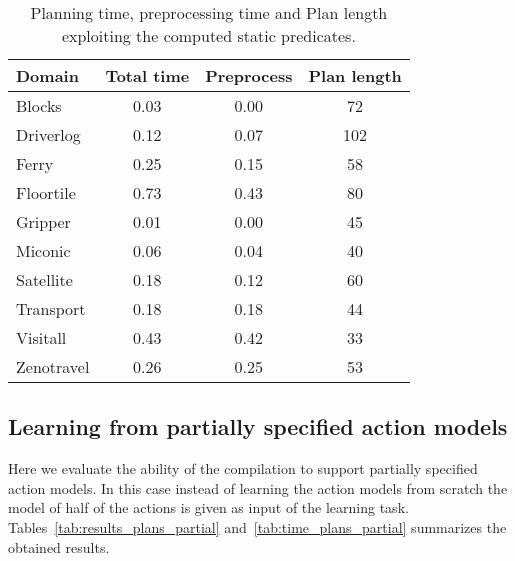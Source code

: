 \documentclass[letterpaper]{article} %
\begin{document}
\begin{table}[hbt!]
\begin{footnotesize}
	\begin{center}
		\begin{tabular}{l|c|c|c|}			
			Domain & Total time & Preprocess & Plan length  \\
			\hline
			Blocks & 0.03 & 0.00 & 72 \\
			Driverlog & 0.12 & 0.07 & 102 \\
			Ferry & 0.25 & 0.15 & 58 \\
			Floortile & 0.73 & 0.43 & 80 \\
			Gripper & 0.01 & 0.00 & 45 \\
			Miconic & 0.06 & 0.04 & 40 \\
			Satellite & 0.18 & 0.12 & 60 \\
			Transport & 0.18 & 0.18 & 44 \\
			Visitall & 0.43 & 0.42 & 33 \\
			Zenotravel & 0.26 & 0.25 & 53
		\end{tabular}
	\end{center}
        \end{footnotesize}
	\caption{\small Planning time, preprocessing time and Plan length exploiting the computed static predicates.}
	\label{tab:time_plans_static}	
\end{table}

\subsection{Learning from partially specified action models}

Here we evaluate the ability of the compilation to support partially specified action models. In this case instead of learning the action models from scratch the model of half of the actions is given as input of the learning task. Tables~\ref{tab:results_plans_partial} and~\ref{tab:time_plans_partial} summarizes the obtained results.	
\end{document}

